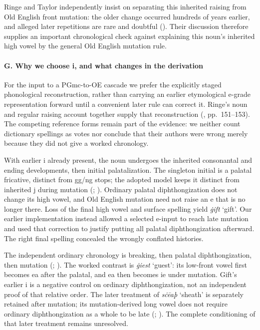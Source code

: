 \documentclass[
  british,
  a4paper,
]{article}
\begin{document}
Ringe and Taylor independently insist on separating this inherited
raising from Old English front mutation: the older change occurred
hundreds of years earlier, and alleged later repetitions are rare and
doubtful ().
Their discussion therefore supplies an important chronological check
against explaining this noun's inherited high vowel by the general Old
English mutation rule.

\paragraph{G. Why we choose i, and what changes in the
derivation}\label{g.-why-we-choose-i-and-what-changes-in-the-derivation}

For the input to a PGmc-to-OE cascade we prefer the explicitly staged
phonological reconstruction, rather than carrying an earlier
etymological e-grade representation forward until a convenient later
rule can correct it. Ringe's noun and regular raising account together
supply that reconstruction (,
pp.~151--153). The competing reference forms remain part of the
evidence: we neither count dictionary spellings as votes nor conclude
that their authors were wrong merely because they did not give a worked
chronology.

With earlier i already present, the noun undergoes the inherited
consonantal and ending developments, then initial palatalization. The
singleton initial is a palatal fricative, distinct from gg/ng stops; the
adopted model keeps it distinct from inherited j during mutation
(;
). Ordinary
palatal diphthongization does not change its high vowel, and Old English
mutation need not raise an e that is no longer there. Loss of the final
high vowel and surface spelling yield \emph{ġift} `gift'. Our earlier
implementation instead allowed a selected e-input to reach late mutation
and used that correction to justify putting all palatal diphthongization
afterward. The right final spelling concealed the wrongly conflated
histories.

The independent ordinary chronology is breaking, then palatal
diphthongization, then mutation (;
).
The worked contrast is \emph{ġiest} `guest': its low-front vowel first
becomes ea after the palatal, and ea then becomes ie under mutation.
Gift's earlier i is a negative control on ordinary diphthongization, not
an independent proof of that relative order. The later treatment of
\emph{sċēaþ} `sheath' is separately retained after mutation; its
mutation-derived long vowel does not require ordinary diphthongization
as a whole to be late (; ).
The complete conditioning of that later treatment remains unresolved.
\end{document}
